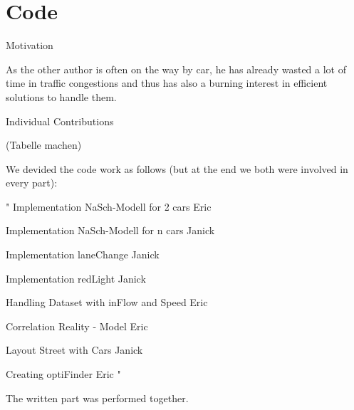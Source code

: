 \section*{Code}





Motivation

As the other author is often on the way by car, he has already wasted a lot of time in traffic congestions
and thus has also a burning interest in efficient solutions to handle them.

Individual Contributions


(Tabelle machen)

We devided the code work as follows (but at the end we both were involved in every part):

"
Implementation NaSch-Modell for 2 cars  Eric

Implementation NaSch-Modell for n cars  Janick

Implementation laneChange Janick

Implementation redLight Janick

Handling Dataset with inFlow and Speed  Eric

Correlation Reality - Model Eric

Layout Street with Cars  Janick

Creating optiFinder Eric
"

The written part was performed together.
